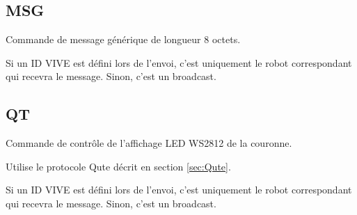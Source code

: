 \subsection{MSG}
	\label{subsec:a:MSG}

	Commande de message générique de longueur 8 octets.

	Si un ID VIVE est défini lors de l'envoi, c'est uniquement le robot correspondant qui recevra le message. Sinon, c'est un broadcast.

\subsection{QT}
	\label{subsec:a:QT}

	Commande de contrôle de l'affichage LED WS2812 de la couronne.

	Utilise le protocole Qute décrit en section \ref{sec:Qute}.

	Si un ID VIVE est défini lors de l'envoi, c'est uniquement le robot correspondant qui recevra le message. Sinon, c'est un broadcast.
